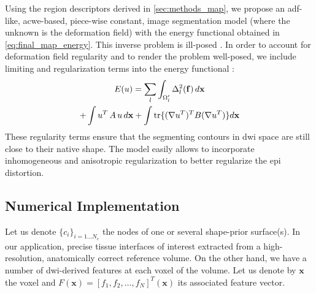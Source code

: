 {\color{red} {Using the region descriptors derived in \autoref{sec:methods_map}, we propose
an \gls{adf}-like, \gls{acwe}-based, piece-wise constant, image segmentation
model (where the unknown is the deformation field)
\cite{chan_active_2001} with the energy functional obtained in 
\eqref{eq:final_map_energy}. This inverse problem is ill-posed
\cite{bertero_ill-posed_1988,hadamard_sur_1902}.
In order to account for deformation field regularity and to render the 
problem well-posed, we include limiting and regularization terms into 
the energy functional \cite{morozov_linear_1975,tichonov_solution_1963}:
%
\begin{multline}
E(u) = \sum\limits_l \int_{\Omega'_l} \Delta^2_l (\mathbf{f}) \,d\mathbf{x} \\
+ \int u^T \, A \, u \, d\mathbf{x} + \int \tr\{(\nabla u^T)^T B (\nabla u^T)\} d\mathbf{x}
\label{eq:complete_energy}
\end{multline}
%
These regularity terms ensure that the segmenting contours in 
\gls{dwi} space are still close to their native shape. The model
easily allows to incorporate inhomogeneous and anisotropic 
regularization \cite{nagel_investigation_1986} to better regularize
the \gls{epi} distortion.}}


\subsection{Numerical Implementation}
\label{sec:numerical_implementation}
%
Let us denote $\{c_i\}_{i=1 \ldots N_c}$ the nodes of one or several shape-prior
surface(s). In our application, precise tissue interfaces of interest 
extracted from a high-resolution, anatomically correct reference volume. 
On the other hand, we have a number of \gls{dwi}-derived features at each
voxel of the volume. Let us denote by $\mathbf{x}$ the voxel and $F(\mathbf{x}) = 
[ f_1, f_2, \ldots, f_N]^T(\mathbf{x})$ its associated feature vector.


